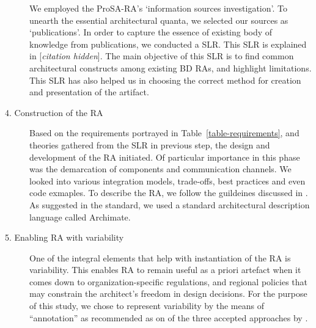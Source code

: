 \documentclass[a4paper,11pt]{article}
\let\cite\citep
\newcommand{\hc}{[\textit{citation hidden}]\textnormal{}}
\begin{document}
\begin{description}
We employed the ProSA-RA's `information sources investigation'. To unearth the essential architectural quanta, we selected our sources as `publications'. In order to capture the essence of existing body of knowledge from publications, we conducted a SLR. This SLR is explained in
\hc{}. The main objective of this SLR is to find common architectural constructs among existing BD RAs, and highlight limitations. This SLR has also helped us in choosing the correct method for creation and presentation of the artifact.








\item[4. Construction of the RA] Based on the requirements portrayed in Table~\ref{table-requirements}, and theories gathered from the SLR in previous step, the design and development of the RA initiated. Of particular importance in this phase was the demarcation of components and communication channels. We looked into various integration models, trade-offs, best practices and even code exmaples. To describe the RA, we follow the guildeines discussed in \citet{ISO42010}. As suggested in the standard, we used a standard architectural description language called Archimate.


\item[5. Enabling RA with variability] One of the integral elements that help with instantiation of the RA is variability. This enables RA to remain useful as a priori artefact when it comes down to organization-specific regulations, and regional policies that may constrain the architect's freedom in design decisions. For the purpose of this study, we chose to represent variability by the means of ``annotation'' as recommended as on of the three accepted approaches by \citet{galster2011empirically}.



\end{description}
\end{document}
